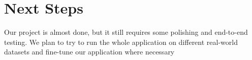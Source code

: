 \documentclass{article}
\begin{document}
\section{Next Steps}
Our project is almost done, but it still requires some polishing and end-to-end testing. We plan to try to run the whole application on different real-world datasets and fine-tune our application where necessary
\end{document}
